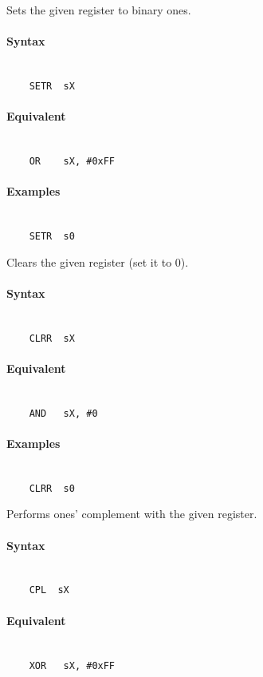     Sets the given register to binary ones.

    \paragraph{Syntax}
        ~\\
        \verb'    SETR  sX'

    \paragraph{Equivalent}
        ~\\
        \verb'    OR    sX, #0xFF'

    \paragraph{Examples}
        ~\\
        \verb'    SETR  s0'

    Clears the given register (set it to 0).

    \paragraph{Syntax}
        ~\\
        \verb'    CLRR  sX'

    \paragraph{Equivalent}
        ~\\
        \verb'    AND   sX, #0'

    \paragraph{Examples}
        ~\\
        \verb'    CLRR  s0'

    Performs ones' complement with the given register.

    \paragraph{Syntax}
        ~\\
        \verb'    CPL  sX'

    \paragraph{Equivalent}
        ~\\
        \verb'    XOR   sX, #0xFF'

